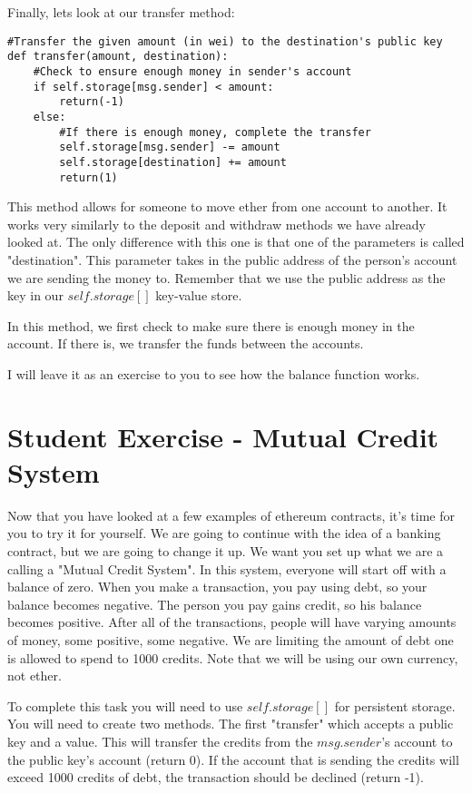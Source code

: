 \documentclass[12pt]{article}
\begin{document}
Finally, lets look at our transfer method:

\begin{verbatim}
#Transfer the given amount (in wei) to the destination's public key
def transfer(amount, destination):
	#Check to ensure enough money in sender's account
	if self.storage[msg.sender] < amount:
		return(-1)
	else:
		#If there is enough money, complete the transfer
		self.storage[msg.sender] -= amount
		self.storage[destination] += amount
		return(1)
\end{verbatim}

This method allows for someone to move ether from one account to another. It works very similarly to the deposit and withdraw methods we have already looked at. The only difference with this one is that one of the parameters is called "destination". This parameter takes in the public address of the person's account we are sending the money to. Remember that we use the public address as the key in our $self.storage[]$ key-value store. 

In this method, we first check to make sure there is enough money in the account. If there is, we transfer the funds between the accounts. 

I will leave it as an exercise to you to see how the balance function works.  

\section{Student Exercise - Mutual Credit System}
Now that you have looked at a few examples of ethereum contracts, it's time for you to try it for yourself. We are going to continue with the idea of a banking contract, but we are going to change it up. We want you set up what we are a calling a "Mutual Credit System". In this system, everyone will start off with a balance of zero. When you make a transaction, you pay using debt, so your balance becomes negative. The person you pay gains credit, so his balance becomes positive. After all of the transactions, people will have varying amounts of money, some positive, some negative. We are limiting the amount of debt one is allowed to spend to 1000 credits. Note that we will be using our own currency, not ether.

To complete this task you will need to use $self.storage[]$ for persistent storage. You will need to create two methods. The first "transfer" which accepts a public key and a value. This will transfer the credits from the $msg.sender$'s account to the public key's account (return 0). If the account that is sending the credits will exceed 1000 credits of debt, the transaction should be declined (return -1). 
\end{document}
